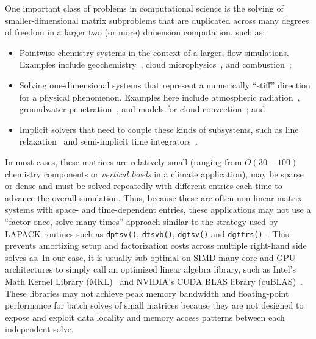 \documentclass{sig-alternate-05-2015}
\begin{document}
One important class of problems in computational science is the solving
  of smaller-dimensional matrix subproblems that are duplicated across
  many degrees of freedom in a larger two (or more) dimension computation,
  such as:
\begin{itemize}
\item Pointwise chemistry systems in the context of a larger, 
  flow simulations. 
Examples include geochemistry~\cite{PFLOTRAN_2010}, 
  cloud microphysics~\cite{MG2_2015}, and combustion~\cite{PaznerEtAl_2016};
\item Solving one-dimensional systems that represent a numerically ``stiff''
  direction for a physical phenomenon.
Examples here include atmospheric radiation~\cite{RRTMG_2008}, groundwater
  penetration~\cite{CLM_PFLO_2016}, and models for 
  cloud convection~\cite{SAM_2005}; and
\item Implicit solvers that need to couple these kinds of subsystems, 
  such as line relaxation~\cite{TrottenbergEtAl_2000} and 
  semi-implicit time integrators~\cite{WellerEtAl_2013}.
\end{itemize}
In most cases, these matrices are relatively small 
  (ranging from \(O(30-100)\) chemistry components or \emph{vertical levels}
  in a climate application), may be sparse or dense and must be solved
  repeatedly with different entries each time to advance the overall simulation.
Thus, because these are often non-linear matrix systems with space- and 
  time-dependent entries, these applications may not use a 
  ``factor once, solve many times'' approach similar to the strategy used by
  LAPACK routines such as \lstinline{dptsv()}, \lstinline{dtsvb()},
  \lstinline{dgtsv()} and \lstinline{dgttrs()}~\cite{intel_mkl_manual}.
This prevents amortizing setup and factorization costs across multiple
  right-hand side solves as.
In our case, it is usually sub-optimal on SIMD many-core and GPU
  architectures to simply call an optimized linear algebra library, 
  such as Intel's Math Kernel Library (MKL)~\cite{mkl_website} and NVIDIA's
  CUDA BLAS library (cuBLAS)~\cite{cublas_website}.
These libraries may not achieve peak memory bandwidth and floating-point
  performance for batch solves of small matrices because they are not designed
  to expose and exploit data locality and memory access patterns between each
  independent solve.
  
\end{document}
